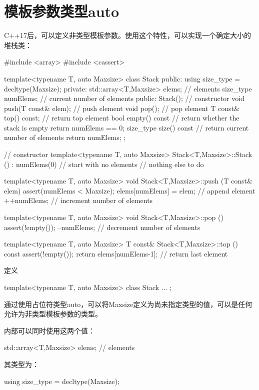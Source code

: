 \section{模板参数类型auto}
C++17后，可以定义非类型模板参数。使用这个特性，可以实现一个确定大小的堆栈类：

\begin{cpp}
#include <array>
#include <cassert>

template<typename T, auto Maxsize>
class Stack {
	public:
	using size_type = decltype(Maxsize);
private:
	std::array<T,Maxsize> elems; // elements
	size_type numElems; // current number of elements
public:
	Stack(); // constructor
	void push(T const& elem); // push element
	void pop(); // pop element
	T const& top() const; // return top element
	bool empty() const { // return whether the stack is empty
		return numElems == 0;
	}
	size_type size() const { // return current number of elements
		return numElems;
	}
};

// constructor
template<typename T, auto Maxsize>
Stack<T,Maxsize>::Stack ()
: numElems(0) // start with no elements
{
	// nothing else to do
}

template<typename T, auto Maxsize>
void Stack<T,Maxsize>::push (T const& elem)
{
	assert(numElems < Maxsize);
	elems[numElems] = elem; // append element
	++numElems; // increment number of elements
}

template<typename T, auto Maxsize>
void Stack<T,Maxsize>::pop ()
{
	assert(!empty());
	--numElems; // decrement number of elements
}

template<typename T, auto Maxsize>
T const& Stack<T,Maxsize>::top () const
{
	assert(!empty());
	return elems[numElems-1]; // return last element
}
\end{cpp}

定义

\begin{cpp}
template<typename T, auto Maxsize>
class Stack {
	...
};
\end{cpp}

通过使用占位符类型auto，可以将Maxsize定义为尚未指定类型的值，可以是任何允许为非类型模板参数的类型。

内部可以同时使用这两个值：

\begin{cpp}
std::array<T,Maxsize> elems; // elements
\end{cpp}

其类型为：

\begin{cpp}
using size_type = decltype(Maxsize);
\end{cpp}

